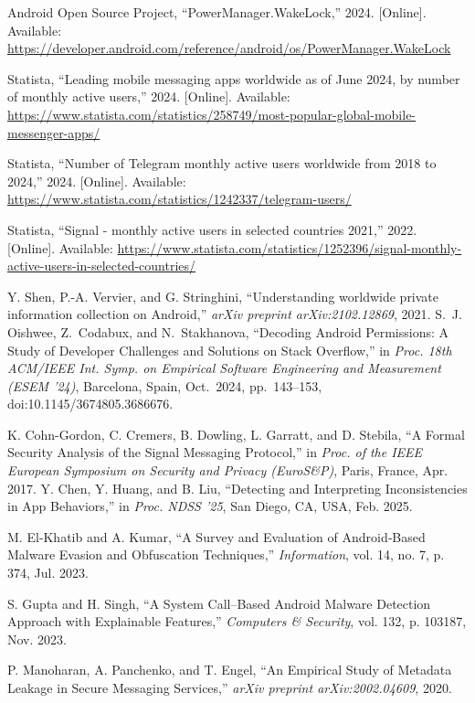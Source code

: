 \documentclass[a4paper,12pt]{report}
\begin{document}
\begin{thebibliography}{99}
Android Open Source Project, “PowerManager.WakeLock,” 2024. [Online]. Available: \url{https://developer.android.com/reference/android/os/PowerManager.WakeLock}

Statista, “Leading mobile messaging apps worldwide as of June 2024, by number of monthly active users,” 2024. [Online]. Available: \url{https://www.statista.com/statistics/258749/most-popular-global-mobile-messenger-apps/}

Statista, “Number of Telegram monthly active users worldwide from 2018 to 2024,” 2024. [Online]. Available: \url{https://www.statista.com/statistics/1242337/telegram-users/}

Statista, “Signal - monthly active users in selected countries 2021,” 2022. [Online]. Available: \url{https://www.statista.com/statistics/1252396/signal-monthly-active-users-in-selected-countries/}


Y. Shen, P.-A. Vervier, and G. Stringhini, ``Understanding worldwide private information collection on Android,'' \emph{arXiv preprint arXiv:2102.12869}, 2021.
S.~J. Oishwee, Z.~Codabux, and N.~Stakhanova, “Decoding Android Permissions: A Study of Developer Challenges and Solutions on Stack Overflow,” in \emph{Proc. 18th ACM/IEEE Int. Symp. on Empirical Software Engineering and Measurement (ESEM ’24)}, Barcelona, Spain, Oct. 2024, pp. 143–153, doi:10.1145/3674805.3686676.

K. Cohn-Gordon, C. Cremers, B. Dowling, L. Garratt, and D. Stebila, “A Formal Security Analysis of the Signal Messaging Protocol,” in \emph{Proc. of the IEEE European Symposium on Security and Privacy (EuroS\&P)}, Paris, France, Apr. 2017.
Y. Chen, Y. Huang, and B. Liu, “Detecting and Interpreting Inconsistencies in App Behaviors,” in \emph{Proc. NDSS ’25}, San Diego, CA, USA, Feb. 2025.

M. El‐Khatib and A. Kumar, “A Survey and Evaluation of Android‐Based Malware Evasion and Obfuscation Techniques,” \emph{Information}, vol. 14, no. 7, p. 374, Jul. 2023.

S. Gupta and H. Singh, “A System Call–Based Android Malware Detection Approach with Explainable Features,” \emph{Computers \& Security}, vol. 132, p. 103187, Nov. 2023.

P. Manoharan, A. Panchenko, and T. Engel, “An Empirical Study of Metadata Leakage in Secure Messaging Services,” \emph{arXiv preprint arXiv:2002.04609}, 2020.


\end{thebibliography}
\end{document}

